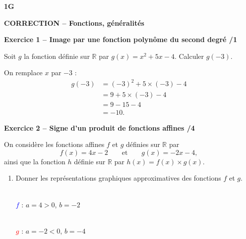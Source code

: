 \documentclass[10pt,a4paper]{article}
\renewcommand{\niveau}{1G}
\renewcommand{\chapitre}{Fonctions, généralités}
\renewcommand{\interroversion}[1]{
    \noindent\textbf{\niveau}

    \vspace{-0.5cm}
    \begin{center}
        \textbf{\large CORRECTION -- \chapitre}
    \end{center}

    \vspace{0.1cm}
}
\begin{document}
\begin{sujets}

\interroversion{C}

\textbf{Exercice 1 -- Image par une fonction polynôme du second degré \hfill /1}

Soit \(g\) la fonction définie sur \(\mathbb{R}\) par \(g(x)=x^2+5x-4\). Calculer \(g(-3)\).

On remplace \(x\) par \(-3\) :
\[
\begin{aligned}
g(-3) &= (-3)^2+5\times(-3)-4\\
      &= 9+5\times(-3)-4\\
      &= 9-15-4\\
      &= -10.
\end{aligned}
\]

\textbf{Exercice 2 -- Signe d'un produit de fonctions affines \hfill /4}

On considère les fonctions affines \(f\) et \(g\) définies sur \(\mathbb{R}\) par
\[
f(x)=4x-2 \qquad\text{et}\qquad g(x)=-2x-4,
\]
ainsi que la fonction \(h\) définie sur \(\mathbb{R}\) par \(h(x)=f(x)\times g(x)\).

\begin{enumerate}
\item Donner les représentations graphiques approximatives des fonctions \(f\) et \(g\).

\begin{center}
\begin{minipage}{2.6cm}
\centering
{}\\[2pt]
{\scriptsize \textcolor{blue}{\(f\)} : \(a=4>0\), \(b=-2\)}
\end{minipage}
\hspace{0.3cm}
\begin{minipage}{2.6cm}
\centering
{}\\[2pt]
{\scriptsize \textcolor{red}{\(g\)} : \(a=-2<0\), \(b=-4\)}
\end{minipage}
\end{center}


\end{enumerate}
\end{sujets}
\end{document}
